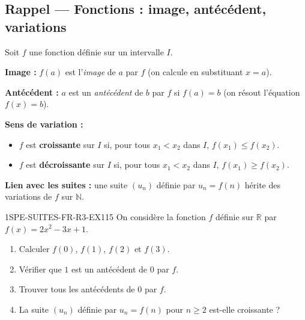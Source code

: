 

\subsection*{Rappel — Fonctions : image, antécédent, variations}

Soit $f$ une fonction définie sur un intervalle $I$.

\textbf{Image :} $f(a)$ est l'\emph{image} de $a$ par $f$ (on calcule en substituant $x = a$).

\textbf{Antécédent :} $a$ est un \emph{antécédent} de $b$ par $f$ si $f(a) = b$ (on résout l'équation $f(x) = b$).

\textbf{Sens de variation :}
\begin{itemize}
  \item $f$ est \textbf{croissante} sur $I$ si, pour tous $x_1 < x_2$ dans $I$, $f(x_1) \leq f(x_2)$.
  \item $f$ est \textbf{décroissante} sur $I$ si, pour tous $x_1 < x_2$ dans $I$, $f(x_1) \geq f(x_2)$.
\end{itemize}

\textbf{Lien avec les suites :} une suite $(u_n)$ définie par $u_n = f(n)$ hérite des variations de $f$ sur $\mathbb{N}$.


\begin{exercice}{1SPE-SUITES-FR-R3-EX1}{1}{5}
On considère la fonction $f$ définie sur $\mathbb{R}$ par $f(x) = 2x^2 - 3x + 1$.
\begin{enumerate}
  \item Calculer $f(0)$, $f(1)$, $f(2)$ et $f(3)$.
  \item Vérifier que $1$ est un antécédent de $0$ par $f$.
  \item Trouver tous les antécédents de $0$ par $f$.
  \item La suite $(u_n)$ définie par $u_n = f(n)$ pour $n \geq 2$ est-elle croissante ?
\end{enumerate}
\end{exercice}

